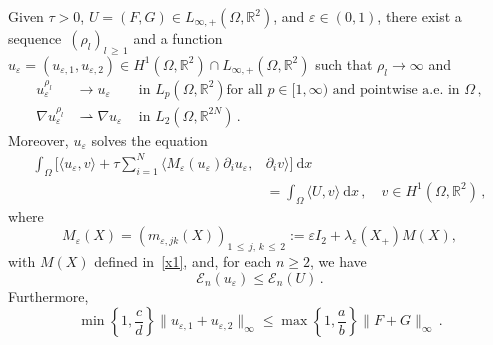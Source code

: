 \documentclass[AHL,Unicode,longabstracts,published]{cedram}
\newcommand{\bbR}{\mathbb{R}}
\newcommand{\clE}{\mathcal{E}}
\newcommand{\rmd}{\mathrm{d}}
\newcommand{\clE}{\mathcal{E}}
\begin{document}
\begin{lemm}\label{lem.ex3}
Given $\tau>0$, $U=(F,G)\in L_{\infty,+}(\Omega,\bbR^2)$, and $\varepsilon\in (0,1)$, there exist a sequence~$(\rho_l)_{l\,\ge\,1}$ and a function~${u_{\varepsilon} = (u_{\varepsilon,1}, u_{\varepsilon,2}) \in H^1(\Omega,\bbR^2)\cap L_{\infty,+}(\Omega,\bbR^2)}$ such that $\rho_l\to\infty$ and
\begin{align}
u_\varepsilon^{\rho_l}&\to u_\varepsilon\qquad\text{in }L_p\left(\Omega,\bbR^2\right) \text{for all }p\in [1,\infty)\text{ and pointwise a.e. in }\Omega\,,\label{conv1}
\\[1ex]
\nabla u_\varepsilon^{\rho_l}&\rightharpoonup \nabla u_\varepsilon\quad\, \text{in }L_2\left(\Omega,\bbR^{2N}\right)\,.\label{conv3}
\end{align}
Moreover, $u_\varepsilon$ solves the equation
\begin{align}
\int_\Omega \bigg[\langle u_{\varepsilon}, v \rangle + \tau \sum_{i=1}^N\big\langle M_{\varepsilon}(u_{\varepsilon}) \partial_i u_{\varepsilon}, &\partial_i v \big\rangle \bigg]\ \rmd x \label{ex12aa}\\
&=\int_\Omega \langle U, v \rangle\ \rmd x\,, \quad v\in H^1\left(\Omega,\bbR^2\right)\,, \nonumber
\end{align}
where
\begin{equation*}
M_{\varepsilon}(X) = \left(m_{\varepsilon, jk}(X)\right)_{1\,\le\,j,\,k\,\le\,2}:= \varepsilon I_2 + \lambda_\varepsilon(X_{+}) M(X),
\end{equation*}
with $M(X)$ defined in~\eqref{x1}, and, for each $n\ge 2$, we have
\begin{equation}\label{ex12ba}
\clE_n(u_\varepsilon)\le \clE_n(U)\,. 
\end{equation}
Furthermore,
\begin{equation}\label{ex12bac}
\min\left\{ 1, \frac{c}{d}\right\} \|u_{\varepsilon,1}+u_{\varepsilon,2}\|_\infty \le \max\left\{1,\frac{a}{b} \right\}\|F+G\|_\infty\,. 
\end{equation}
\end{lemm}
\end{document}
